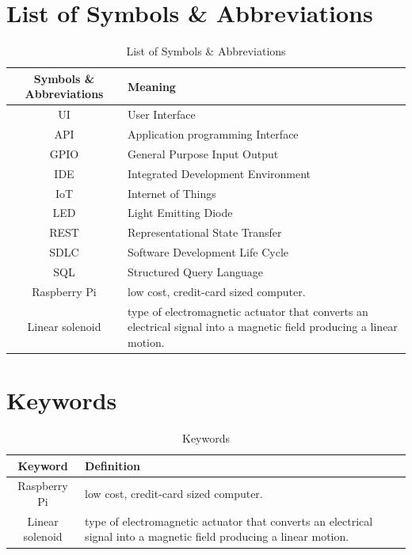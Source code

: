 \documentclass[12pt, oneside, a4paper]{book}
\newcommand\boldcolor[1]{\textcolor{bold}{\textbf{#1}}}
\begin{document}
	\chapter*{List of Symbols \& Abbreviations}
	\label{sec:sym}
	\def\arraystretch{1.5}
	\begin{table}[H]
		\caption{List of Symbols \& Abbreviations}
		\begin{center}
			\begin{tabularx}{\linewidth}{|c|X|}\hline
				
				\boldcolor{Symbols \& Abbreviations} & \boldcolor{Meaning} \\\hline
				UI & User Interface\\\hline
				API & Application programming Interface\\\hline
				GPIO & General Purpose Input Output\\\hline
				IDE & Integrated Development Environment \\\hline
				IoT & Internet of Things \\\hline
				LED & Light Emitting Diode\\\hline
				REST & Representational State Transfer\\\hline
				SDLC & Software Development Life Cycle\\\hline
				SQL & Structured Query Language\\\hline
				Raspberry Pi & low cost, credit-card sized computer\cite{raspberry}. \\\hline
				Linear solenoid &  type of electromagnetic actuator that converts an electrical signal into a magnetic field producing a linear motion\cite{linear}.\\\hline
			\end{tabularx}
		\end{center}
	\end{table}
	\newpage
	\chapter*{Keywords}
	\label{sec:kw}
	\def\arraystretch{1.5}
	\begin{table}[H]
		\caption{Keywords}
		\begin{center}
			\begin{tabularx}{\linewidth}{|c|X|}\hline		
				\boldcolor{Keyword} & \boldcolor{Definition} \\\hline
				Raspberry Pi & low cost, credit-card sized computer\cite{raspberry}. \\\hline
				Linear solenoid &  type of electromagnetic actuator that converts an electrical signal into a magnetic field producing a linear motion\cite{linear}.\\\hline				
			\end{tabularx}
		\end{center}
	\end{table}
	\newpage
\end{document}
